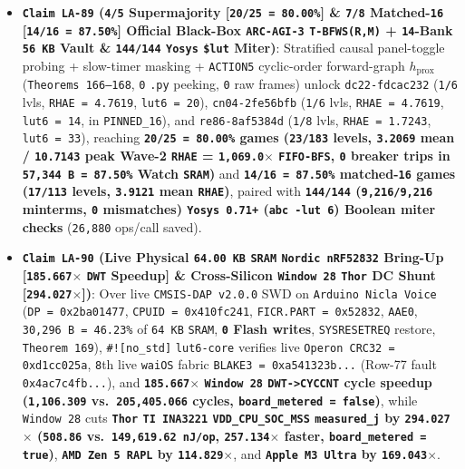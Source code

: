 \documentclass[10pt]{article}
\begin{document}
\begin{itemize}
  \item \textbf{\texttt{Claim LA-89} (\texttt{4/5} Supermajority [\texttt{20/25 = 80.00\%}] \& \texttt{7/8} Matched-\texttt{16} [\texttt{14/16 = 87.50\%}] Official Black-Box \texttt{ARC-AGI-3} \texttt{T-BFWS(R,M)} + \texttt{14}-Bank \texttt{56 KB} Vault \& \texttt{144/144} \texttt{Yosys} \texttt{\$lut} Miter)}: Stratified causal panel-toggle probing + slow-timer masking + \texttt{ACTION5} cyclic-order forward-graph $h_{\text{prox}}$ (\texttt{Theorems 166--168}, \texttt{0} \texttt{.py} peeking, \texttt{0} raw frames) unlock \texttt{dc22-fdcac232} (\texttt{1/6} lvls, \texttt{RHAE = 4.7619}, \texttt{lut6 = 20}), \texttt{cn04-2fe56bfb} (\texttt{1/6} lvls, \texttt{RHAE = 4.7619}, \texttt{lut6 = 14}, in \texttt{PINNED\_16}), and \texttt{re86-8af5384d} (\texttt{1/8} lvls, \texttt{RHAE = 1.7243}, \texttt{lut6 = 33}), reaching \textbf{\texttt{20/25 = 80.00\%} games (\texttt{23/183} levels, \texttt{3.2069} mean / \texttt{10.7143} peak Wave-2 \texttt{RHAE} = \texttt{1,069.0$\times$} \texttt{FIFO-BFS}, \texttt{0} breaker trips in \texttt{57,344 B = 87.50\%} Watch \texttt{SRAM})} and \textbf{\texttt{14/16 = 87.50\%} matched-\texttt{16} games (\texttt{17/113} levels, \texttt{3.9121} mean \texttt{RHAE})}, paired with \textbf{\texttt{144/144} (\texttt{9,216/9,216} minterms, \texttt{0} mismatches) \texttt{Yosys 0.71+} (\texttt{abc -lut 6}) Boolean miter checks} (\texttt{26,880} ops/call saved).
  \item \textbf{\texttt{Claim LA-90} (Live Physical \texttt{64.00 KB} \texttt{SRAM} \texttt{Nordic nRF52832} Bring-Up [\texttt{185.667$\times$} \texttt{DWT} Speedup] \& Cross-Silicon \texttt{Window 28} \texttt{Thor} DC Shunt [\texttt{294.027$\times$}])}: Over live \texttt{CMSIS-DAP v2.0.0} SWD on \texttt{Arduino Nicla Voice} (\texttt{DP = 0x2ba01477}, \texttt{CPUID = 0x410fc241}, \texttt{FICR.PART = 0x52832}, \texttt{AAE0}, \texttt{30,296 B = 46.23\%} of \texttt{64 KB} \texttt{SRAM}, \textbf{\texttt{0} Flash writes}, \texttt{SYSRESETREQ} restore, \texttt{Theorem 169}), \texttt{\#![no\_std]} \texttt{lut6-core} verifies live \texttt{Operon CRC32 = 0xd1cc025a}, \texttt{8}th live \texttt{waiOS} fabric \texttt{BLAKE3 = 0xa541323b...} (Row-77 fault \texttt{0x4ac7c4fb...}), and \textbf{\texttt{185.667$\times$} \texttt{Window 28} \texttt{DWT->CYCCNT} cycle speedup (\texttt{1,106.309} vs.\ \texttt{205,405.066} cycles, \texttt{board\_metered = false})}, while \texttt{Window 28} cuts \textbf{\texttt{Thor} \texttt{TI INA3221} \texttt{VDD\_CPU\_SOC\_MSS} \texttt{measured\_j} by \texttt{294.027$\times$} (\texttt{508.86} vs.\ \texttt{149,619.62 nJ/op}, \texttt{257.134$\times$} faster, \texttt{board\_metered = true})}, \textbf{\texttt{AMD Zen 5 RAPL} by \texttt{114.829$\times$}}, and \textbf{\texttt{Apple M3 Ultra} by \texttt{169.043$\times$}}.

\end{itemize}
\end{document}
